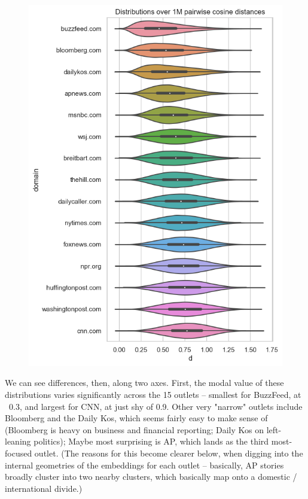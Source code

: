 \documentclass{scrartcl}
\begin{document}
\begin{figure}[H]
  \centering
  \includegraphics[height=0.6\textheight]{figures/pwd-violins.png}
\end{figure}

We can see differences, then, along two axes. First, the modal value of these distributions varies significantly across the 15 outlets -- smallest for BuzzFeed, at ~0.3, and largest for CNN, at just shy of 0.9. Other very "narrow" outlets include Bloomberg and the Daily Kos, which seems fairly easy to make sense of (Bloomberg is heavy on business and financial reporting; Daily Kos on left-leaning politics); Maybe most surprising is AP, which lands as the third most-focused outlet. (The reasons for this become clearer below, when digging into the internal geometries of the embeddings for each outlet -- basically, AP stories broadly cluster into two nearby clusters, which basically map onto a domestic / international divide.)
\end{document}
